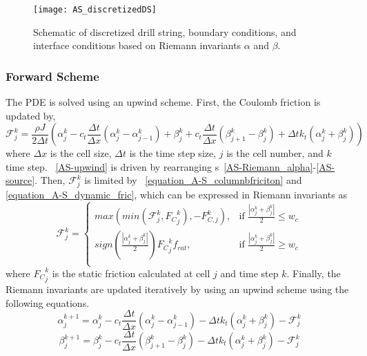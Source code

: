 \begin{figure}
  \centering
  \texttt{[image: AS\_discretizedDS]}
  \caption[Schematic of discretized drill string and boundary conditions]{Schematic of discretized drill string, boundary conditions, and interface conditions based on Riemann invariants $\alpha$ and $\beta$.}\label{AS_discretizeDS}
\end{figure}

\subsubsection{Forward Scheme}
The PDE is solved using an upwind scheme. First, the Coulomb friction is updated by,
\begin{equation}
    \label{AS-upwind}
    \mathcal{F}_{j}^k = \frac{\rho J}{2 \Delta t}\left(\alpha_j^k - c_t \frac{\Delta t}{\Delta x}(\alpha_j^k - \alpha_{j-1}^k) + \beta_j^k + c_t \frac{\Delta t}{\Delta x}(\beta_{j+1}^k-\beta_j^k) + \Delta t k_t (\alpha_j^k + \beta_j^k)\right)
\end{equation}
where $\Delta x$ is the cell size, $\Delta t$ is the time step size, $j$ is the cell number, and $k$ time step.  \equationname~\ref{AS-upwind} is driven by rearranging \equationname{}s~\ref{AS-Riemann_alpha}-\ref{AS-source}. Then, $\mathcal{F}_{j}^k$ is limited by \equationname~\ref{equation_A-S_columnbfriciton} and \ref{equation_A-S_dynamic_fric}, which can be expressed in Riemann invariants as
\begin{equation}
	\label{equation_A-S_columnbfriciton_Riemann}
	\mathcal{F}_{j}^k =
	\begin{cases}
		max(min(\mathcal{F}_{j}^k,{F_C}_j^k),-F_{C,j}^k) , & \mbox{if } \frac{|\alpha_j^k + \beta_j^k|}{2} \le w_c \\
		sign(\frac{|\alpha_j^k + \beta_j^k|}{2}){F_C}_j^k f_{rat} , & \mbox{if } \frac{|\alpha_j^k + \beta_j^k|}{2} \ge w_c \\
	\end{cases}
\end{equation}
where ${F_C}_j^k$ is the static friction calculated at cell $j$ and time step $k$. Finally, the Riemann invariants are updated iteratively by using an upwind scheme using the following equations.
\begin{equation}\label{equation_upwind_alpha}
  \alpha_j^{k+1} = \alpha_j^{k} - c_t \frac{\Delta t}{\Delta x}(\alpha_j^k - \alpha_{j-1}^k) - \Delta t k_t (\alpha_j^k + \beta_j^k) - \mathcal{F}_j^k
\end{equation}
\begin{equation}\label{equation_upwind_beta}
  \beta_j^{k+1} = \beta_j^{k} - c_t \frac{\Delta t}{\Delta x}(\beta_{j+1}^k - \beta_{j}^k) - \Delta t k_t (\alpha_j^k + \beta_j^k) - \mathcal{F}_j^k
\end{equation}

